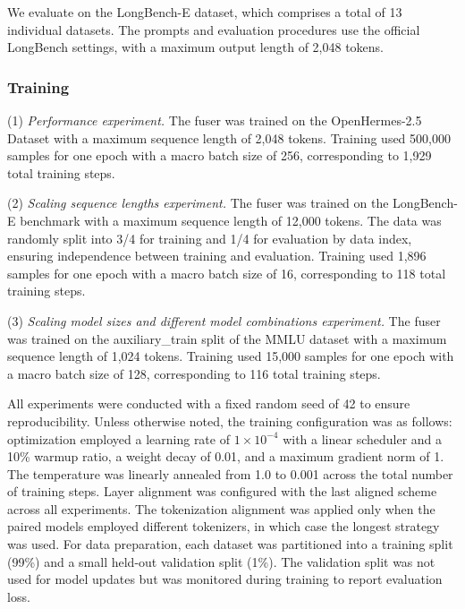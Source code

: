 We evaluate \name on the LongBench-E dataset, which comprises a total of 13 individual datasets. 
The prompts and evaluation procedures use the official LongBench settings, with a maximum output length of 2,048 tokens.

\subsubsection{\name Training}
(1) \emph{Performance experiment.}
The fuser was trained on the OpenHermes-2.5 Dataset with a maximum sequence length of 2,048 tokens. Training used 500,000 samples for one epoch with a macro batch size of 256, corresponding to 1,929 total training steps.  

(2) \emph{Scaling sequence lengths experiment.}
The fuser was trained on the LongBench-E benchmark with a maximum sequence length of 12,000 tokens. 
The data was randomly split into 3/4 for training and 1/4 for evaluation by data index, ensuring independence between training and evaluation. 
Training used 1,896 samples for one epoch with a macro batch size of 16, corresponding to 118 total training steps.

(3) \emph{Scaling model sizes and different model combinations experiment.}
The fuser was trained on the auxiliary\_train split of the MMLU dataset with a maximum sequence length of 1,024 tokens. Training used 15,000 samples for one epoch with a macro batch size of 128, corresponding to 116 total training steps.  

 All experiments were conducted with a fixed random seed of 42 to ensure reproducibility. Unless otherwise noted, the training configuration was as follows: optimization employed a learning rate of $1 \times 10^{-4}$ with a linear scheduler and a 10\% warmup ratio, a weight decay of 0.01, and a maximum gradient norm of 1. The temperature was linearly annealed from 1.0 to 0.001 across the total number of training steps. Layer alignment was configured with the last aligned scheme across all experiments. The tokenization alignment was applied only when the paired models employed different tokenizers, in which case the longest strategy was used. For data preparation, each dataset was partitioned into a training split (99\%) and a small held-out validation split (1\%). The validation split was not used for model updates but was monitored during training to report evaluation loss.


